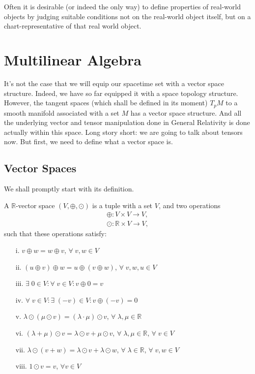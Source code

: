 Often it is desirable (or indeed the only way) to define properties of real-world objects by judging suitable conditions not on the real-world object itself, but on a chart-representative of that real world object.

\section{Multilinear Algebra}
It's not the case that we will equip our spacetime set with a vector space structure. Indeed, we have so far equipped it with a space topology structure. However, the tangent spaces (which shall be defined in its moment) $T_p M$ to a smooth manifold associated with a set $M$ has a vector space structure. And all the underlying vector and tensor manipulation done in General Relativity is done actually within this space. Long story short: we are going to talk about tensors now. But first, we need to define what a vector space is.

\subsection{Vector Spaces}
We shall promptly start with its definition.

\begin{definition}
    A $\mathbb{R}$-vector space $(V, \oplus, \odot)$ is a tuple with a set $V$, and two operations
    \begin{align*}
        \oplus : V \times V \longrightarrow V, \\
        \odot : \mathbb{R} \times V \longrightarrow V,
    \end{align*}
    such that these operations satisfy:
    \begin{itemize}
        \item[i.]  $v \oplus w = w \oplus v$, $\forall \; v, w \in V$
        \item[ii.] $(u \oplus v) \oplus w = u \oplus (v \oplus w)$, $\forall \; v, w, u \in V$
        \item[iii.] $\exists \; 0 \in V: \forall \; v \in V: v\oplus0=v$
        \item[iv.] $\forall \; v \in V: \exists \; (-v) \in V: v \oplus (-v) = 0$
        \item[v.] $\lambda \odot (\mu \odot v) = (\lambda \cdot \mu) \odot v$, $\forall \; \lambda, \mu \in \mathbb{R}$
        \item[vi.] $(\lambda + \mu) \odot v = \lambda \odot v + \mu \odot v$, $\forall \; \lambda, \mu \in \mathbb{R}$, $\forall \; v \in V$
        \item[vii.] $\lambda \odot (v + w) = \lambda \odot v + \lambda \odot w$, $\forall \; \lambda \in \mathbb{R}$, $\forall \; v, w \in V$
        \item[viii.] $1 \odot v = v$, $\forall v \in V$
    \end{itemize}
\end{definition}

